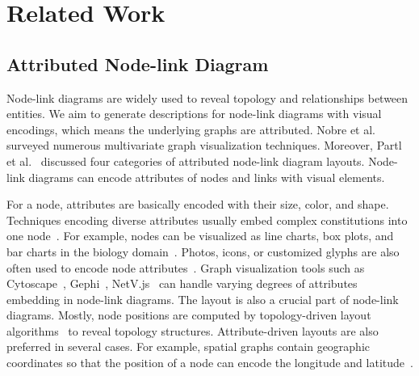 \section{Related Work}\label{sec:relatedwork}
\subsection{Attributed Node-link Diagram}
Node-link diagrams are widely used to reveal topology and relationships between entities.
We aim to generate descriptions for node-link diagrams with visual encodings, which means the underlying graphs are attributed.
Nobre et al.~\cite{DBLP:journals/cgf/NobreMSL19} surveyed numerous multivariate graph visualization techniques.
Moreover, Partl et al.~\cite{DBLP:conf/biovis/PartlKLKSS12} discussed four categories of attributed node-link diagram layouts.
Node-link diagrams can encode attributes of nodes and links with visual elements.

For a node, attributes are basically encoded with their size, color, and shape.
Techniques encoding diverse attributes usually embed complex constitutions into one node~\cite{DBLP:conf/infovis/AuberCJM03}.
For example, nodes can be visualized as line charts, box plots, and bar charts in the biology domain~\cite{gehlenborg2010visualization, DBLP:conf/iv/JusufiDK10}.
Photos, icons, or customized glyphs are also often used to encode node attributes~\cite{DBLP:conf/chi/DunneS13}.
Graph visualization tools such as Cytoscape~\cite{DBLP:journals/bioinformatics/FranzLHDSB16}, Gephi~\cite{DBLP:conf/icwsm/BastianHJ09}, NetV.js~\cite{HAN2021} can handle varying degrees of attributes embedding in node-link diagrams.
The layout is also a crucial part of node-link diagrams.
Mostly, node positions are computed by topology-driven layout algorithms~\cite{DBLP:journals/spe/FruchtermanR91, DBLP:journals/cgf/KruigerRMKKT17, DBLP:journals/tvcg/GansnerHN13, DBLP:journals/tvcg/ZhuCHHLZ21} to reveal topology structures.
Attribute-driven layouts are also preferred in several cases.
For example, spatial graphs contain geographic coordinates so that the position of a node can encode the longitude and latitude~\cite{DBLP:journals/tvcg/ElzenW14, DBLP:journals/tvcg/Guo09}.

